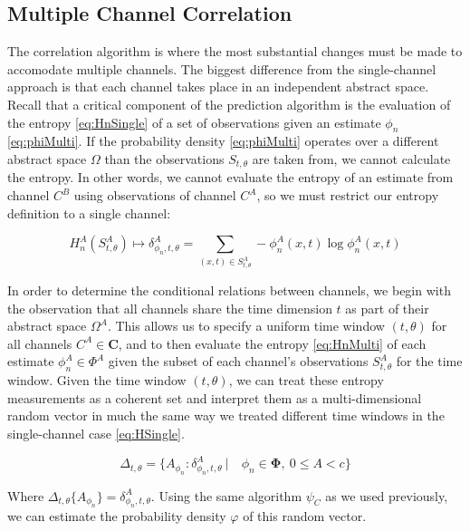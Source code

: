 \documentclass[10pt]{article}
\begin{document}
\subsection{Multiple Channel Correlation}

The correlation algorithm is where the most substantial changes must be made to accomodate multiple channels.  The biggest difference from the single-channel approach is that each channel takes place in an independent abstract space.  Recall that a critical component of the prediction algorithm is the evaluation of the entropy \ref{eq:HnSingle} of a set of observations given an estimate \( \phi_n \) \ref{eq:phiMulti}.  If the probability density \ref{eq:phiMulti} operates over a different abstract space \(\Omega \) than the observations \(S_{t,\theta} \) are taken from, we cannot calculate the entropy.  In other words, we cannot evaluate the entropy of an estimate from channel \(C^B \) using observations of channel \(C^A \), so we must restrict our entropy definition to a single channel:

\begin{equation} \label{eq:HnMulti} H_n^A( S_{t,\theta}^A ) \mapsto \delta_{\phi_n,t,\theta}^A = \sum_{(x,t) \in S_{t,\theta}^A } -\phi_n^A(x,t) \log \phi_n^A(x,t) \end{equation}

In order to determine the conditional relations between channels, we begin with the observation that all channels share the time dimension \(t \) as part of their abstract space \(\Omega^A \).  This allows us to specify a uniform time window \((t,\theta) \) for all channels \(C^A \in \mathbf{C} \), and to then evaluate the entropy \ref{eq:HnMulti} of each estimate \(\phi_n^A \in \Phi^A \) given the subset of each channel's observations \(S_{t,\theta}^A \) for the time window.  Given the time window \((t,\theta) \), we can treat these entropy measurements as a coherent set and interpret them as a multi-dimensional random vector in much the same way we treated different time windows in the single-channel case \ref{eq:HSingle}.

\[
\Delta_{t,\theta} = \{ A_{\phi_n} : \delta_{\phi_n,t,\theta}^A \ | \quad \phi_n \in \boldsymbol{\Phi}, \ 0 \le A < c \}
\]

Where \( \Delta_{t,\theta} \{ A_{\phi_n} \} = \delta_{\phi_n,t,\theta}^A \). Using the same algorithm \(\psi_C \) as we used previously, we can estimate the probability density \(\varphi \) of this random vector. 
\end{document}
